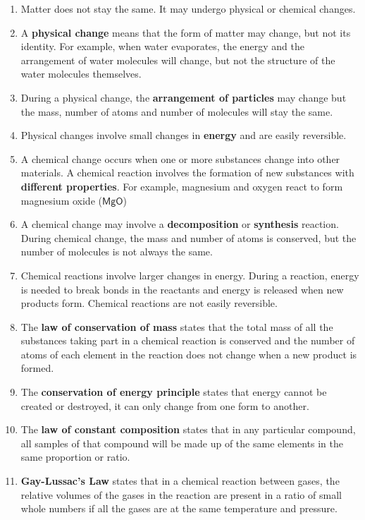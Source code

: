       \label{m38711*id65342}\begin{enumerate}[noitemsep, label=\textbf{\arabic*}. ] 
            \label{m38711*uid40}\item Matter does not stay the same. It may undergo physical or chemical changes.
\label{m38711*uid41}\item A \textbf{physical change} means that the form of matter may change, but not its identity. For example, when water evaporates, the energy and the arrangement of water molecules will change, but not the structure of the water molecules themselves.
\label{m38711*uid42}\item During a physical change, the \textbf{arrangement of particles} may change but the mass, number of atoms and number of molecules will stay the same.
\label{m38711*uid43}\item Physical changes involve small changes in \textbf{energy} and are easily reversible.
\label{m38711*uid44}\item A chemical change occurs when one or more substances change into other materials. A chemical reaction involves the formation of new substances with \textbf{different properties}. For example, magnesium and oxygen react to form magnesium oxide ($\mathsf{MgO}$) \label{m38711*uid45}\item A chemical change may involve a \textbf{decomposition} or \textbf{synthesis} reaction. During chemical change, the mass and number of atoms is conserved, but the number of molecules is not always the same.
\label{m38711*uid46}\item Chemical reactions involve larger changes in energy. During a reaction, energy is needed to break bonds in the reactants and energy is released when new products form. Chemical reactions are not easily reversible.
\label{m38711*uid48}\item The \textbf{law of conservation of mass} states that the total mass of all the substances taking part in a chemical reaction is conserved and the number of atoms of each element in the reaction does not change when a new product is formed.
\label{m38711*uid49}\item The \textbf{conservation of energy principle} states that energy cannot be created or destroyed, it can only change from one form to another.
\label{m38711*uid50}\item The \textbf{law of constant composition} states that in any particular compound, all samples of that compound will be made up of the same elements in the same proportion or ratio.
\label{m38711*uid51}\item \textbf{Gay-Lussac's Law} states that in a chemical reaction between gases, the relative volumes of the gases in the reaction are present in a ratio of small whole numbers if all the gases are at the same temperature and pressure.
\end{enumerate}
